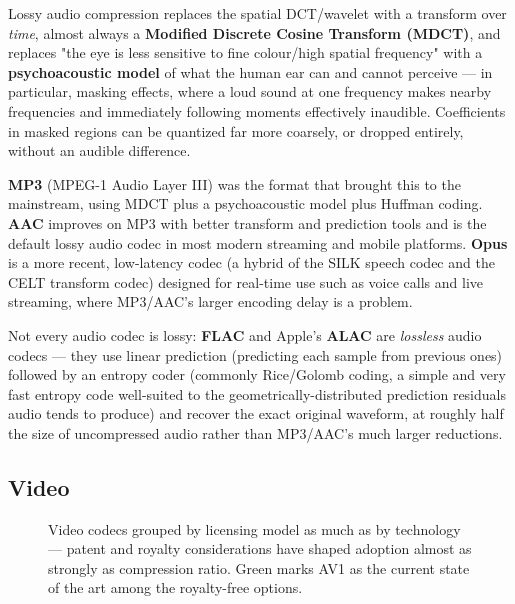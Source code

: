 \documentclass[11pt]{article}
\begin{document}
Lossy audio compression replaces the spatial DCT/wavelet with a transform over \emph{time}, almost always a \textbf{Modified Discrete Cosine Transform (MDCT)}, and replaces "the eye is less sensitive to fine colour/high spatial frequency" with a \textbf{psychoacoustic model} of what the human ear can and cannot perceive — in particular, masking effects, where a loud sound at one frequency makes nearby frequencies and immediately following moments effectively inaudible. Coefficients in masked regions can be quantized far more coarsely, or dropped entirely, without an audible difference.

\textbf{MP3} (MPEG-1 Audio Layer III) was the format that brought this to the mainstream, using MDCT plus a psychoacoustic model plus Huffman coding. \textbf{AAC} improves on MP3 with better transform and prediction tools and is the default lossy audio codec in most modern streaming and mobile platforms. \textbf{Opus} is a more recent, low-latency codec (a hybrid of the SILK speech codec and the CELT transform codec) designed for real-time use such as voice calls and live streaming, where MP3/AAC's larger encoding delay is a problem.

Not every audio codec is lossy: \textbf{FLAC} and Apple's \textbf{ALAC} are \emph{lossless} audio codecs — they use linear prediction (predicting each sample from previous ones) followed by an entropy coder (commonly Rice/Golomb coding, a simple and very fast entropy code well-suited to the geometrically-distributed prediction residuals audio tends to produce) and recover the exact original waveform, at roughly half the size of uncompressed audio rather than MP3/AAC's much larger reductions.

\subsection{Video}

\begin{figure}[h]
\centering
{}
\caption{Video codecs grouped by licensing model as much as by technology — patent and royalty considerations have shaped adoption almost as strongly as compression ratio. Green marks AV1 as the current state of the art among the royalty-free options.}
\end{figure}
\end{document}
